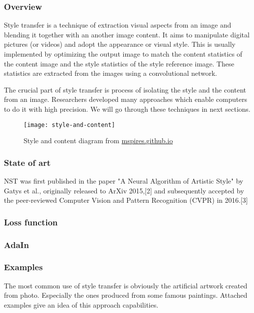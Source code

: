 \documentclass[../Main.tex]{subfiles}
\begin{document}
    \subsubsection{Overview}
    Style transfer is a technique of extraction visual aspects from an image and blending it together with an another image content. It aims to manipulate digital pictures (or videos) and adopt the appearance or visual style. This is usually implemented by optimizing the output image to match the content statistics of the content image and the style statistics of the style reference image. These statistics are extracted from the images using a convolutional network. 
    
    The crucial part of style transfer is process of isolating the style and the content from an image. Researchers developed many approaches which enable computers to do it with high precision. We will go through these techniques in next sections. 
    \\
    \begin{figure}[h]
        \centering
        \texttt{[image: style-and-content]}
        \caption{Style and content diagram from \href{https://mspries.github.io/OpticalIllusionReportPage.html}{mspires.github.io}}
        \label{fig:style-and-content}
    \end{figure}

    \subsubsection{State of art}
    NST was first published in the paper "A Neural Algorithm of Artistic Style" by Gatys et al., originally released to ArXiv 2015,[2] and subsequently accepted by the peer-reviewed Computer Vision and Pattern Recognition (CVPR) in 2016.[3]
    
    \subsubsection{Loss function}
    
    \subsubsection{AdaIn}
    
    \subsubsection{Examples}
    The most common use of style transfer is obviously the artificial artwork created from photo. Especially the ones produced from some famous paintings. Attached examples give an idea of this approach capabilities. 
    
\end{document}
